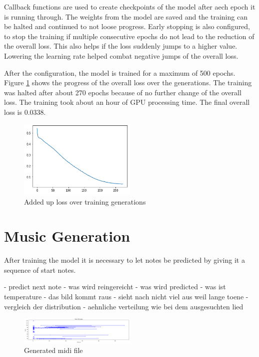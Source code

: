 Callback functions are used to create checkpoints of the model after aech epoch it is running through. The weights from the model
are saved and the training can be halted and continued to not loose progress. Early stopping is also configured, to stop the 
training if multiple consecutive epochs do not lead to the reduction of the overall loss. This also helps if the loss suddenly
jumps to a higher value. Lowering the learning rate helped combat negative jumps of the overall loss.

After the configuration, the model is trained for a maximum of 500 epochs. Figure \ref{fig:loss} shows the progress of the 
overall loss over the generations. The training was halted after about 270 epochs because of no further change of the overall loss.
The training took about an hour of GPU processing time. The final overall loss is 0.0338.


\begin{figure}
\centering
\includegraphics[width=0.5\textwidth]{./pics/Loss.PNG}
\caption{Added up loss over training generations}
\label{fig:loss}    
\end{figure}

\section{Music Generation}
\label{gen}

After training the model it is necessary to let notes be predicted by giving it a sequence of start notes. 

- predict next note
- was wird reingereicht
- was wird predicted 
- was ist temperature
- das bild kommt raus 
- sieht nach nicht viel aus weil lange toene 
- vergleich der distribution
- aehnliche verteilung wie bei dem ausgesuchten lied 


\begin{figure}
\centering
\includegraphics[width=0.5\textwidth]{./pics/genNotes.PNG}
\caption{Generated midi file}
\label{fig:genNotes}    
\end{figure}

